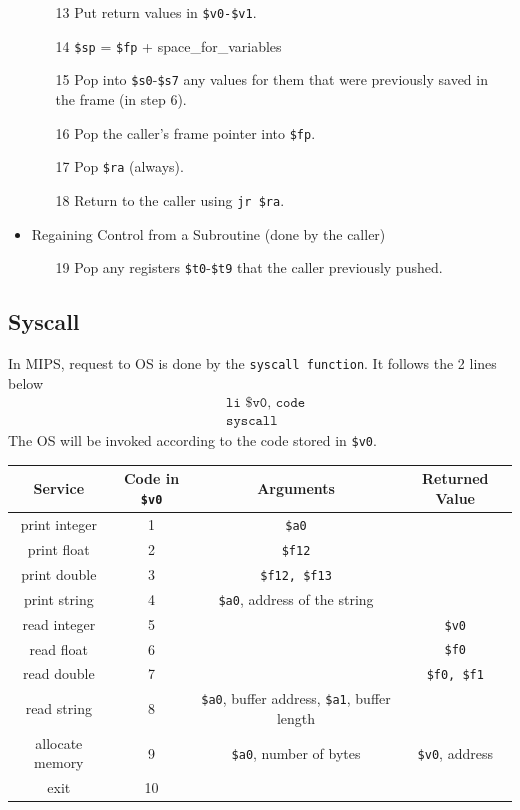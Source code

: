 \documentclass[12pt]{article}
\theoremstyle{definition}
\begin{document}
\begin{itemize}
\begin{enumerate}
  \item[13] Put return values in \texttt{\$v0-\$v1}.
\item[14] \texttt{\$sp} = \texttt{\$fp} + space\_for\_variables
\item[15] Pop into \texttt{\$s0}-\texttt{\$s7} any values for them that were previously saved in the frame (in step 6).
\item[16] Pop the caller's frame pointer into \texttt{\$fp}.
\item[17] Pop \texttt{\$ra} (always).
\item[18] Return to the caller using \texttt{jr \$ra}.
\end{enumerate}
\item Regaining Control from a Subroutine (done by the caller)
\begin{enumerate}
  \item[19] Pop any registers \texttt{\$t0}-\texttt{\$t9} that the caller previously pushed.
\end{enumerate}
\end{itemize}
\subsection{Syscall}
In MIPS, request to OS is done by the \texttt{syscall function}. It follows the 2 lines below
\begin{align*}
&\texttt{li \$v0, code}\\
&\texttt{syscall}
\end{align*}
The OS will be invoked according to the code stored in \texttt{\$v0}. 
\clearpage
\begin{table}[h]
\centering
\begin{tabular}{|c|c|c|c|}
\hline
Service&Code in \texttt{\$v0}& Arguments &Returned Value\\\hline
print integer&1&\texttt{\$a0}&\\\hline
print float&2&\texttt{\$f12}&\\\hline
print double&3&\texttt{\$f12, \$f13}&\\\hline
print string&4&\texttt{\$a0}, address of the string&\\\hline
read integer&5&&\texttt{\$v0}\\\hline
read float &6&&\texttt{\$f0}\\\hline
read double&7&&\texttt{\$f0, \$f1}\\\hline
read string &8&\texttt{\$a0}, buffer address, \texttt{\$a1}, buffer length&\\\hline
allocate memory&9&\texttt{\$a0}, number of bytes&\texttt{\$v0}, address\\\hline
exit&10&&\\\hline
\end{tabular}
\end{table}
\clearpage
\end{document}
